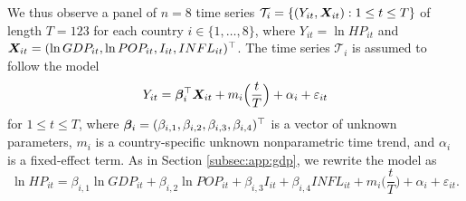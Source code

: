 \documentclass[a4paper,12pt]{article}
\makeatletter
\renewcommand{\eqref}[1]{\tagform@{\ref{#1}}}
\makeatother
\begin{document}
We thus observe a panel of $n = 8$ time series $\mathcal{T}_i = \{(Y_{it}, \boldsymbol{X}_{it}): 1 \le t \le T \}$ of length \linebreak$T = 123$ for each country $i \in \{1,\ldots,8\}$, where $Y_{it} = \ln HP_{it}$ and $\X_{it} = (\ln GDP_{it}, \linebreak \ln POP_{it}, I_{it}, INFL_{it})^\top$. The time series $\mathcal{T}_i$ is assumed to follow the model 
\begin{equation}\label{eq:model:app3}
Y_{it} = \bm{\beta}^\top_i \boldsymbol{X}_{it} + m_i \Big( \frac{t}{T} \Big) + \alpha_i + \varepsilon_{it} 
\end{equation}
for $1 \le t \le T$, where $\bm{\beta}_i = (\beta_{i, 1}, \beta_{i, 2}, \beta_{i, 3}, \beta_{i, 4})^\top$ is a vector of unknown parameters, $m_i$ is a country-specific unknown nonparametric time trend, and $\alpha_i$ is a fixed-effect term. As in Section \ref{subsec:app:gdp}, we rewrite the model \eqref{eq:model:app3} as
\begin{equation}\label{eq:model:app4}
\ln HP_{it} = \beta_{i, 1} \ln GDP_{it} + \beta_{i, 2} \ln POP_{it} + \beta_{i, 3} I_{it} + \beta_{i, 4} INFL_{it} + m_i \Big( \frac{t}{T} \Big) + \alpha_i + \varepsilon_{it}.
\end{equation}
\end{document}
